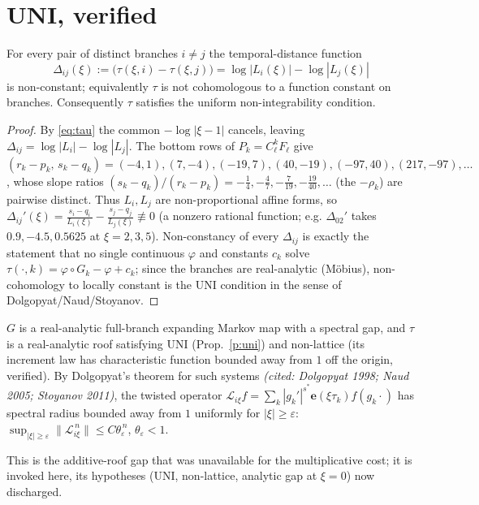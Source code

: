 \documentclass[11pt]{article}
\theoremstyle{remark}\newtheorem{remark}{Remark}
\newcommand{\Lop}{\mathcal L}\newcommand{\e}{\mathbf e}
\begin{document}
\section{UNI, verified}
\begin{proposition}\label{p:uni}
For every pair of distinct branches $i\neq j$ the temporal-distance function
\[
\Delta_{ij}(\xi):=\big(\tau(\xi,i)-\tau(\xi,j)\big)=\log|L_i(\xi)|-\log|L_j(\xi)|
\]
is non-constant; equivalently $\tau$ is not cohomologous to a function
constant on branches. Consequently $\tau$ satisfies the uniform
non-integrability condition.
\end{proposition}
\begin{proof}
By \eqref{eq:tau} the common $-\log|\xi-1|$ cancels, leaving
$\Delta_{ij}=\log|L_i|-\log|L_j|$. The bottom rows of $P_k=C_\ell^kF_\ell$ give
$(r_k-p_k,\,s_k-q_k)=(-4,1),(7,-4),(-19,7),(40,-19),(-97,40),(217,-97),\dots$,
whose slope ratios $(s_k-q_k)/(r_k-p_k)=-\tfrac14,-\tfrac47,-\tfrac{7}{19},
-\tfrac{19}{40},\dots$ (the $-\rho_k$) are pairwise distinct. Thus $L_i,L_j$
are non-proportional affine forms, so $\Delta_{ij}'(\xi)=\frac{s_i-q_i}{L_i(\xi)}
-\frac{s_j-q_j}{L_j(\xi)}\not\equiv0$ (a nonzero rational function; e.g.
$\Delta_{02}'$ takes $0.9,-4.5,0.5625$ at $\xi=2,3,5$). Non-constancy of every
$\Delta_{ij}$ is exactly the statement that no single continuous $\varphi$ and
constants $c_k$ solve $\tau(\cdot,k)=\varphi\circ G_k-\varphi+c_k$; since the
branches are real-analytic (M\"obius), non-cohomology to locally constant is
the UNI condition in the sense of Dolgopyat/Naud/Stoyanov.
\end{proof}

\begin{proposition}\label{p:gap}
$G$ is a real-analytic full-branch expanding Markov map with a spectral gap,
and $\tau$ is a real-analytic roof satisfying UNI (Prop.~\ref{p:uni}) and
non-lattice (its increment law has characteristic function bounded away from
$1$ off the origin, verified). By Dolgopyat's theorem for such systems
\emph{(cited: Dolgopyat 1998; Naud 2005; Stoyanov 2011)}, the twisted operator
$\Lop_{i\xi}f=\sum_k|g_k'|^{s^\ast}\e(\xi\tau_k)f(g_k\cdot)$ has spectral radius
bounded away from $1$ uniformly for $|\xi|\ge\varepsilon$:
$\sup_{|\xi|\ge\varepsilon}\|\Lop_{i\xi}^{\,n}\|\le C\theta_\varepsilon^{\,n}$,
$\theta_\varepsilon<1$.
\end{proposition}
This is the additive-roof gap that was unavailable for the multiplicative
cost; it is invoked here, its hypotheses (UNI, non-lattice, analytic gap at
$\xi=0$) now discharged.
\end{document}
